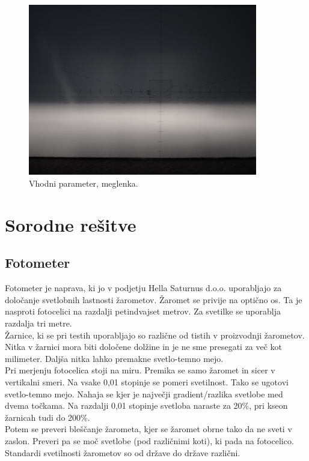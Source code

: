 \documentclass[oneside, a4paper, 12pt]{book}
\begin{document}
\begin{figure}
\begin{center}
\includegraphics[width=10cm]{slike/levi3.JPG}
\end{center}
\caption{Vhodni parameter, meglenka.}
\label{pic:vhp2}
\end{figure}


\chapter{Sorodne rešitve}
\section{Fotometer}
Fotometer je naprava, ki jo v podjetju Hella Saturnus d.o.o. uporabljajo za določanje svetlobnih lastnosti žarometov. Žaromet se privije na optično os. Ta je nasproti fotocelici na razdalji petindvajset metrov. Za svetilke se uporablja razdalja tri metre. \\
Žarnice, ki se pri testih uporabljajo so različne od tistih v proizvodnji žarometov. Nitka v žarnici mora biti določene dolžine in je ne sme presegati za več kot milimeter. Daljša nitka lahko premakne svetlo-temno mejo.\\
Pri merjenju fotocelica stoji na miru. Premika se samo žaromet in sicer v vertikalni smeri. Na vsake 0,01 stopinje se pomeri svetilnost. Tako se ugotovi svetlo-temno mejo. Nahaja se kjer je največji gradient/razlika svetlobe med dvema točkama. Na razdalji 0,01 stopinje svetloba naraste za 20\%, pri kseon žarnicah tudi do 200\%.\\
Potem se preveri bleščanje žarometa, kjer se žaromet obrne tako da ne sveti v zaslon. Preveri pa se moč svetlobe (pod različnimi koti), ki pada na fotocelico.   \\
Standardi svetilnosti žarometov so od države do države različni. 
\end{document}
